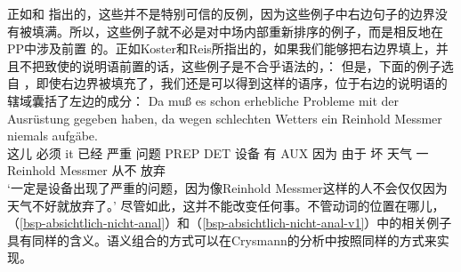 \begin{enumerate}
{\zl
	正如\citet[Section~6]{Koster75a}和\citet*[]{Reis80a} 指出的，这些并不是特别可信的反例，因为这些例子中右边句子的边界没有被填满。所以，这些例子就不必是对中场内部重新排序的例子，而是相反地在PP中涉及前置 的。正如Koster和Reis所指出的，如果我们能够把右边界填上，并且不把致使的说明语前置的话，这些例子是不合乎语法的，：
\eal
{}
\zl
但是，下面的例子选自\citet[]{Crysmann2004a} ，即使右边界被填充了，我们还是可以得到这样的语序，位于右边的说明语的辖域囊括了左边的成分：
\ea
\gll Da muß es schon erhebliche Probleme mit der Ausrüstung gegeben haben, da wegen schlechten
  Wetters ein Reinhold Messmer niemals aufgäbe.\\
  这儿 必须 it 已经 严重 问题 PREP DET 设备 有 AUX 因为 由于 坏 天气 一 Reinhold Messmer 从不
  放弃\\
 \glt `一定是设备出现了严重的问题，因为像Reinhold Messmer这样的人不会仅仅因为天气不好就放弃了。'
\z
尽管如此，这并不能改变任何事。不管动词的位置在哪儿，（\ref{bsp-absichtlich-nicht-anal}）和（\ref{bsp-absichtlich-nicht-anal-v1}）中的相关例子具有同样的含义。语义组合的方式可以在Crysmann的分析中按照同样的方式来实现。
}
\end{enumerate}
